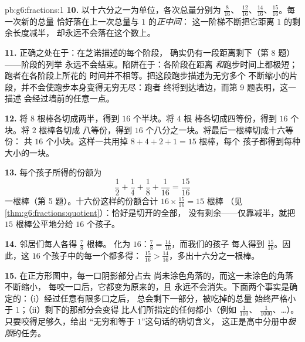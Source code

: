 \begin{solution}{pb:g6:fractions:1}
\textbf{10.} 以十六分之一为单位，各次总量分别为 $\frac{8}{16}$、
$\frac{12}{16}$、$\frac{14}{16}$、$\frac{15}{16}$。每一次新的总量
恰好落在上一次总量与 $1$ 的\emph{正中间}：
这一阶梯不断把它距离 $1$ 的剩余长度减半，
却永远不会落在这个数上。

\textbf{11.} 正确之处在于：在芝诺描述的每个阶段，
确实仍有一段距离剩下（第 8 题）——阶段的列举
永远不会结束。陷阱在于：各阶段在距离
\emph{和}跑步时间上都极短；跑者在各阶段上所花的
时间并不相等。把这段跑步描述为无穷多个
不断缩小的片段，并不会使跑步本身变得无穷无尽：跑者
终将到达墙边，而第 9 题表明，这一描述
会经过墙前的任意一点。

\textbf{12.} 将 $8$ 根棒各切成两半，得到 $16$ 个半块。将 $4$ 根
棒各切成四等份，得到 $16$ 个块。将 $2$ 根棒各切成
八等份，得到 $16$ 个八分之一块。将最后一根棒切成十六等份：
共 $16$ 个小块。这样一共用掉 $8 + 4 + 2 + 1 = 15$ 根棒，每个
孩子都得到每种大小的一块。

\textbf{13.} 每个孩子所得的份额为
\[
\frac12 + \frac14 + \frac18 + \frac{1}{16} = \frac{15}{16}
\]
一根棒（第 5 题）。十六份这样的份额合计
$16 \times \frac{15}{16} = 15$ 根棒
（见\cref{thm:g6:fractions:quotient}）：恰好是切开的全部，
没有剩余——仅靠减半，就把 $15$ 根棒公平地分给 $16$
个孩子。

\textbf{14.} 邻居们每人各得 $\frac78$ 根棒。
化为 $16$：$\frac78 = \frac{14}{16}$，而我们的孩子
每人得到 $\frac{15}{16}$。因此，这 $16$ 个孩子中的每一个都多得：
$\frac{15}{16} > \frac{14}{16}$，多出十六分之一根棒。

\textbf{15.} 在正方形图中，每一口阴影部分占去
尚未涂色角落的，而这一未涂色的角落不断缩小，
每咬一口后，它都变为原来的，且
永远不会消失。下面两个事实是确定的：（i）经过任意有限多口之后，
总会剩下一部分，被吃掉的总量
始终严格小于 $1$；（ii）剩下的那部分会变得
比人们所指定的任何都小（例如 $\frac{1}{100}$、
$\frac{1}{1000}$、\dots）。只要咬得足够久，给出
“无穷和等于 $1$”这句话的确切含义，
这正是高中分册中\emph{极限}的任务。
\end{solution}
